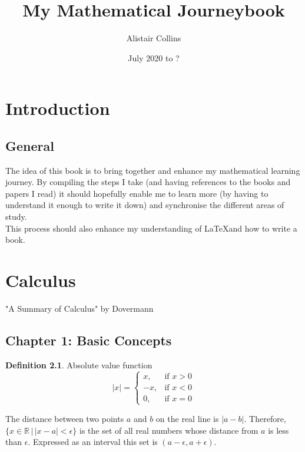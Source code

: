 \documentclass[a4paper,twoside=off]{scrbook}
\title{My Mathematical Journeybook}
\author{Alistair Collins}
\date{July 2020 to ?}
\newcommand{\R}{\mathbb{R}}
\theoremstyle{definition}
\newtheorem{definition}{Definition}[section]
\begin{document}
\maketitle
\tableofcontents

\chapter{Introduction}
\section{General}
The idea of this book is to bring together and enhance my mathematical learning journey.  By compiling the steps I take (and having references to the books and papers I read) it should hopefully enable me to learn more (by having to understand it enough to write it down) and synchronise the different areas of study.\\
This process should also enhance my understanding of \LaTeX and how to write a book.
\vfill


\chapter{Calculus}
"A Summary of Calculus" by Dovermann \cite{Dovermann}

\section{Chapter 1: Basic Concepts}

\begin{definition}
Absolute value function
\begin{equation}
    \lvert x \rvert =\begin{cases}
    x, & \text{if $x>0$}\\
    -x, & \text{if $x<0$}\\
    0, & \text{if $x=0$}
  \end{cases}
\end{equation}
\end{definition}

The distance between two points $a$ and $b$ on the real line is $\lvert a-b \rvert$. 
Therefore, ${ \{ x \in \R \, | \, \lvert x-a \rvert < \epsilon \} }$ 
is the set of all real numbers whose distance from $a$ is less than $\epsilon$.  Expressed as an interval this set is $(a - \epsilon , a + \epsilon )$.
\end{document}
